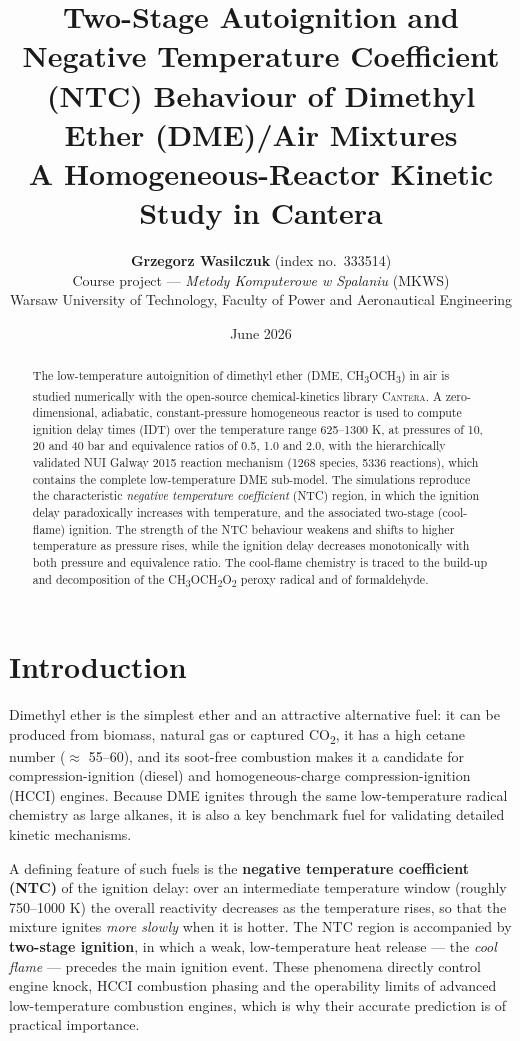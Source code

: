 \documentclass[11pt,a4paper]{article}
\title{\vspace{-1.0cm}\textbf{Two-Stage Autoignition and Negative Temperature
Coefficient (NTC) Behaviour of Dimethyl Ether (DME)/Air Mixtures}\\[0.3cm]
\large A Homogeneous-Reactor Kinetic Study in Cantera}
\author{\textbf{Grzegorz Wasilczuk} \quad (index no.\ 333514)\\[0.25cm]
Course project --- \emph{Metody Komputerowe w Spalaniu} (MKWS)\\
Warsaw University of Technology, Faculty of Power and Aeronautical Engineering}
\date{June 2026}
\newcommand{\dme}{\mbox{CH\textsubscript{3}OCH\textsubscript{3}}}
\begin{document}
\maketitle
\thispagestyle{fancy}

\begin{abstract}
\noindent The low-temperature autoignition of dimethyl ether (DME, \dme) in air
is studied numerically with the open-source chemical-kinetics library
\textsc{Cantera}. A zero-dimensional, adiabatic, constant-pressure homogeneous
reactor is used to compute ignition delay times (IDT) over the temperature range
625--1300 K, at pressures of 10, 20 and 40 bar and equivalence ratios of 0.5, 1.0
and 2.0, with the hierarchically validated NUI Galway 2015 reaction mechanism
(1268 species, 5336 reactions), which contains the complete low-temperature DME
sub-model. The simulations reproduce the characteristic \emph{negative
temperature coefficient} (NTC) region, in which the ignition delay paradoxically
increases with temperature, and the associated two-stage (cool-flame) ignition.
The strength of the NTC behaviour weakens and shifts to higher temperature as
pressure rises, while the ignition delay decreases monotonically with both
pressure and equivalence ratio. The cool-flame chemistry is traced to the
build-up and decomposition of the CH\textsubscript{3}OCH\textsubscript{2}O\textsubscript{2}
peroxy radical and of formaldehyde.
\end{abstract}

\section{Introduction}
Dimethyl ether is the simplest ether and an attractive alternative fuel: it can
be produced from biomass, natural gas or captured CO\textsubscript{2}, it has a
high cetane number ($\approx$ 55--60), and its soot-free combustion makes it a
candidate for compression-ignition (diesel) and homogeneous-charge
compression-ignition (HCCI) engines. Because DME ignites through the same
low-temperature radical chemistry as large alkanes, it is also a key benchmark
fuel for validating detailed kinetic mechanisms.

A defining feature of such fuels is the \textbf{negative temperature coefficient
(NTC)} of the ignition delay: over an intermediate temperature window (roughly
750--1000 K) the overall reactivity decreases as the temperature rises, so that
the mixture ignites \emph{more slowly} when it is hotter. The NTC region is
accompanied by \textbf{two-stage ignition}, in which a weak, low-temperature heat
release --- the \emph{cool flame} --- precedes the main ignition event. These
phenomena directly control engine knock, HCCI combustion phasing and the
operability limits of advanced low-temperature combustion engines, which is why
their accurate prediction is of practical importance.
\end{document}
